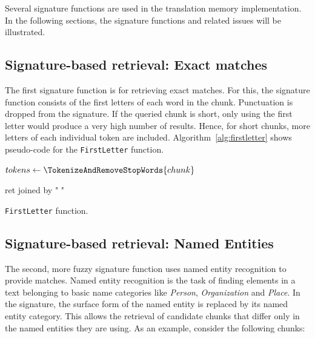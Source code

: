 Several signature functions are used in the translation memory
implementation. In the following sections, the signature functions and related issues will be illustrated.


\subsection{Signature-based retrieval: Exact matches}

The first signature function is for retrieving exact matches. For this,
the signature function consists of the first letters of each word in the
chunk. Punctuation is dropped from the signature. If the queried chunk is
short, only using the first letter would produce a very high number of
results. Hence, for short chunks, more letters of each individual token are
included. Algorithm~\ref{alg:firstletter} shows pseudo-code for the {\tt FirstLetter}
function.

\vspace{1em}
\begin{algorithm}[H]
\label{alg:firstletter}


 \SetAlgoLined

 $tokens \leftarrow \TokenizeAndRemoveStopWords{chunk}$

 \Return ret joined by " "
 \caption{{\tt FirstLetter} function.}
\end{algorithm}





\subsection{Signature-based retrieval: Named Entities}

The second, more fuzzy signature function uses named entity recognition
to provide matches. Named entity recognition is the task of finding
elements in a text belonging to basic name categories like
\emph{Person}, \emph{Organization} and \emph{Place}. In the signature,
the surface form of the named entity is replaced by its named entity
category. This allows the retrieval of candidate chunks that differ only
in the named entities they are using. As an example, consider the
following chunks:

